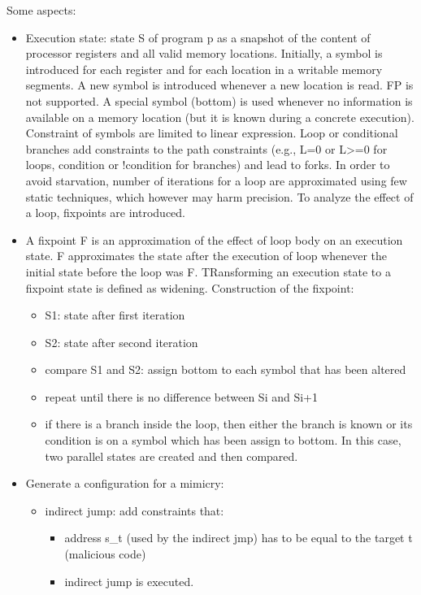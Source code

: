 Some aspects:
\begin{itemize}
  \item Execution state: state S of program p as a snapshot of the content of processor registers and all valid memory locations. Initially, a symbol is introduced for each register and for each location in a writable memory segments. A new symbol is introduced whenever a new location is read. FP is not supported. A special symbol (bottom) is used whenever no information is available on a memory location (but it is known during a concrete execution). Constraint of symbols are limited to linear expression. Loop or conditional branches add constraints to the path constraints (e.g., L=0 or L>=0 for loops, condition or !condition for branches) and lead to forks. In order to avoid starvation, number of iterations for a loop are approximated using few static techniques, which however may harm precision. To analyze the effect of a loop, fixpoints are introduced.
  \item A fixpoint F is an approximation of the effect of loop body on an execution state. F approximates the state after the execution of loop whenever the initial state before the loop was F. TRansforming an execution state to a fixpoint state is defined as widening. Construction of the fixpoint:
  \begin{itemize}
    \item S1: state after first iteration
    \item S2: state after second iteration
    \item compare S1 and S2: assign bottom to each symbol that has been altered
    \item repeat until there is no difference between Si and Si+1
    \item if there is a branch inside the loop, then either the branch is known or its condition is on a symbol which has been assign to bottom. In this case, two parallel states are created and then compared.
  \end{itemize}
  \item Generate a configuration for a mimicry:
  \begin{itemize}
    \item indirect jump: add constraints that:
      \begin{itemize}
        \item address s\_t (used by the indirect jmp) has to be equal to the target t (malicious code)
        \item indirect jump is executed.
      \end{itemize}

\end{itemize}
\end{itemize}
